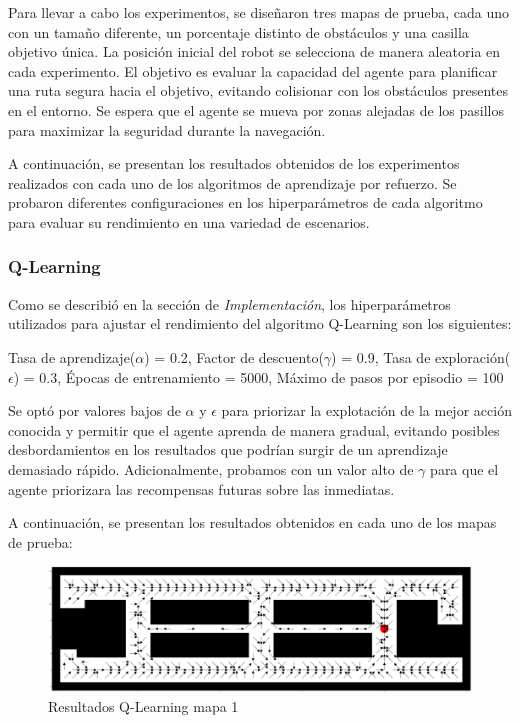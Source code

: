 \documentclass[conference,a4paper]{IEEEtran}
\begin{document}
Para llevar a cabo los experimentos, se diseñaron tres mapas de prueba, cada uno con un tamaño diferente, un porcentaje distinto de obstáculos y 
una casilla objetivo única. La posición inicial del robot se selecciona de manera aleatoria en cada experimento. 
El objetivo es evaluar la capacidad del agente para planificar una ruta segura hacia el objetivo, evitando colisionar con los obstáculos presentes en el entorno. 
Se espera que el agente se mueva por zonas alejadas de los pasillos para maximizar la seguridad durante la navegación.\newline

A continuación, se presentan los resultados obtenidos de los experimentos realizados con cada uno de los algoritmos de aprendizaje por refuerzo. Se probaron diferentes configuraciones en los hiperparámetros de cada algoritmo para evaluar su rendimiento en una variedad de escenarios.\newline

\subsubsection{\textbf{Q-Learning}}

Como se describió en la sección de \textit{Implementación}, los hiperparámetros utilizados para ajustar el rendimiento del algoritmo Q-Learning son los siguientes:\newline

Tasa de aprendizaje($\alpha$) = 0.2, Factor de descuento($\gamma$) = 0.9, Tasa de exploración($\epsilon$) = 0.3,  Épocas de entrenamiento = 5000, Máximo de pasos por episodio = 100\newline

Se optó por valores bajos de $\alpha$ y $\epsilon$ para priorizar la explotación de la mejor acción conocida y permitir que el agente aprenda de manera gradual, evitando posibles desbordamientos en los resultados que podrían surgir de un aprendizaje demasiado rápido.
Adicionalmente, probamos con un valor alto de $\gamma$ para que el agente priorizara las recompensas futuras sobre las inmediatas.\newline

A continuación, se presentan los resultados obtenidos en cada uno de los mapas de prueba:

\begin{figure}[h]
  \centering
  \includegraphics[scale=0.33]{resultado_qlearning_mapa_1}
  \caption{Resultados Q-Learning mapa 1}
  \label{fig:resultado_qlearning_mapa_1}
\end{figure}
\end{document}
